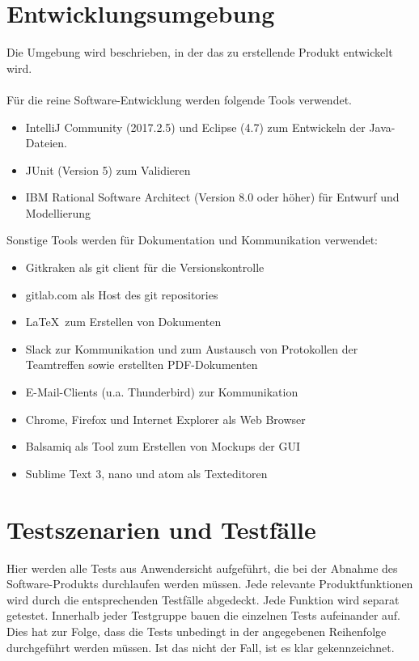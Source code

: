 \documentclass{scrartcl}
\begin{document}
\section{Entwicklungsumgebung}
Die Umgebung wird beschrieben, in der das zu erstellende Produkt entwickelt wird. \\ \\
Für die reine Software-Entwicklung werden folgende Tools verwendet. 

\begin{itemize}
\item IntelliJ Community (2017.2.5) und Eclipse (4.7) zum Entwickeln der Java-Dateien.
\item JUnit (Version 5) zum Validieren
\item IBM Rational Software Architect (Version 8.0 oder höher) für Entwurf und Modellierung
\end{itemize}
Sonstige Tools werden für Dokumentation und Kommunikation verwendet:
\begin{itemize}
\item Gitkraken als git client für die Versionskontrolle
\item gitlab.com als Host des git repositories
\item \LaTeX\ zum Erstellen von Dokumenten
\item Slack zur Kommunikation und zum Austausch von Protokollen der Teamtreffen sowie erstellten PDF-Dokumenten
\item E-Mail-Clients (u.a. Thunderbird) zur Kommunikation
\item Chrome, Firefox und Internet Explorer als Web Browser
\item Balsamiq als Tool zum Erstellen von Mockups der GUI
\item Sublime Text 3, nano und atom als Texteditoren
\end{itemize}

\section{Testszenarien und Testfälle}

Hier werden alle Tests aus Anwendersicht aufgeführt, die bei der Abnahme des Software-Produkts durchlaufen werden müssen. Jede relevante Produktfunktionen wird durch die entsprechenden Testfälle abgedeckt. Jede Funktion wird separat getestet.
Innerhalb jeder Testgruppe bauen die einzelnen Tests aufeinander auf. Dies hat zur Folge, dass die Tests unbedingt in der angegebenen Reihenfolge durchgeführt werden müssen. Ist das nicht der Fall, ist es klar gekennzeichnet.
\end{document}
